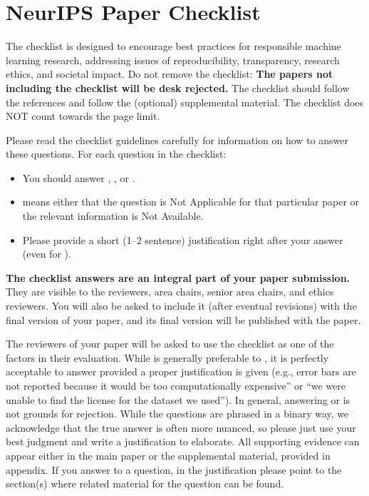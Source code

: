 \documentclass{article}
\theoremstyle{plain}
\theoremstyle{definition}
\theoremstyle{remark}
\begin{document}
\newpage
\section*{NeurIPS Paper Checklist}

The checklist is designed to encourage best practices for responsible machine learning research, addressing issues of reproducibility, transparency, research ethics, and societal impact. Do not remove the checklist: {\bf The papers not including the checklist will be desk rejected.} The checklist should follow the references and follow the (optional) supplemental material.  The checklist does NOT count towards the page
limit. 

Please read the checklist guidelines carefully for information on how to answer these questions. For each question in the checklist:
\begin{itemize}
    \item You should answer \answerYes{}, \answerNo{}, or \answerNA{}.
    \item \answerNA{} means either that the question is Not Applicable for that particular paper or the relevant information is Not Available.
    \item Please provide a short (1--2 sentence) justification right after your answer (even for \answerNA). 
\end{itemize}

{\bf The checklist answers are an integral part of your paper submission.} They are visible to the reviewers, area chairs, senior area chairs, and ethics reviewers. You will also be asked to include it (after eventual revisions) with the final version of your paper, and its final version will be published with the paper.

The reviewers of your paper will be asked to use the checklist as one of the factors in their evaluation. While \answerYes{} is generally preferable to \answerNo{}, it is perfectly acceptable to answer \answerNo{} provided a proper justification is given (e.g., error bars are not reported because it would be too computationally expensive'' or ``we were unable to find the license for the dataset we used''). In general, answering \answerNo{} or \answerNA{} is not grounds for rejection. While the questions are phrased in a binary way, we acknowledge that the true answer is often more nuanced, so please just use your best judgment and write a justification to elaborate. All supporting evidence can appear either in the main paper or the supplemental material, provided in appendix. If you answer \answerYes{} to a question, in the justification please point to the section(s) where related material for the question can be found.
\end{document}
